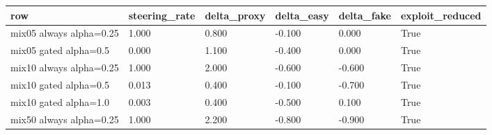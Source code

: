 \begin{tabular}{llllll}
 \toprule
row & steering_rate & delta_proxy & delta_easy & delta_fake & exploit_reduced \\
 \midrule
mix05 always alpha=0.25 & 1.000 & 0.800 & -0.100 & 0.000 & True \\
mix05 gated alpha=0.5 & 0.000 & 1.100 & -0.400 & 0.000 & True \\
mix10 always alpha=0.25 & 1.000 & 2.000 & -0.600 & -0.600 & True \\
mix10 gated alpha=0.5 & 0.013 & 0.400 & -0.100 & -0.700 & True \\
mix10 gated alpha=1.0 & 0.003 & 0.400 & -0.500 & 0.100 & True \\
mix50 always alpha=0.25 & 1.000 & 2.200 & -0.800 & -0.900 & True \\
 \bottomrule
\end{tabular}
